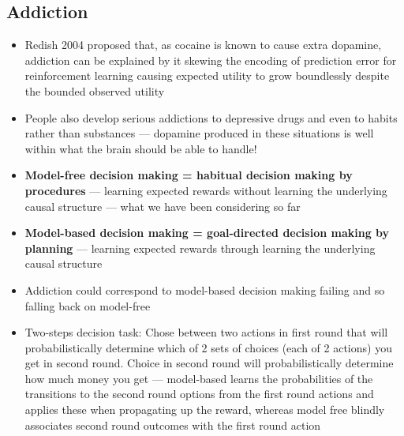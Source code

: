 \documentclass[20pt,a4paper,landscape]{extarticle}
\begin{document}
\begin{flushleft}
\subsection{Addiction}
\begin{itemize}
\item Redish 2004 proposed that, as cocaine is known to cause extra dopamine, addiction can be explained by it skewing the encoding of prediction error for reinforcement learning causing expected utility to grow boundlessly despite the bounded observed utility
\item People also develop serious addictions to depressive drugs and even to habits rather than substances --- dopamine produced in these situations is well within what the brain should be able to handle!
\clearpage
\item \textbf{Model-free decision making = habitual decision making by procedures} --- learning expected rewards without learning the underlying causal structure --- what we have been considering so far
\item \textbf{Model-based decision making = goal-directed decision making by planning} --- learning expected rewards through learning the underlying causal structure
\item Addiction could correspond to model-based decision making failing and so falling back on model-free
\item Two-steps decision task: Chose between two actions in first round that will probabilistically determine which of 2 sets of choices (each of 2 actions) you get in second round. Choice in second round will probabilistically determine how much money you get --- model-based learns the probabilities of the transitions to the second round options from the first round actions and applies these when propagating up the reward, whereas model free blindly associates second round outcomes with the first round action
\end{itemize}

\end{flushleft}
\end{document}
